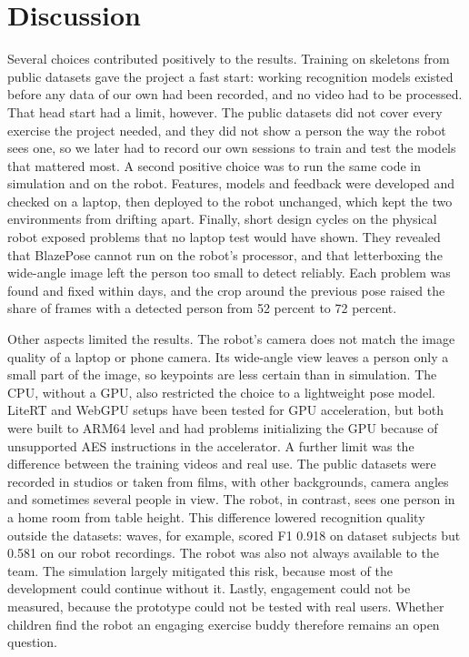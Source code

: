 \section{Discussion}

Several choices contributed positively to the results. Training on skeletons from public datasets gave the project a fast start: working recognition models existed before any data of our own had been recorded, and no video had to be processed. That head start had a limit, however. The public datasets did not cover every exercise the project needed, and they did not show a person the way the robot sees one, so we later had to record our own sessions to train and test the models that mattered most. A second positive choice was to run the same code in simulation and on the robot. Features, models and feedback were developed and checked on a laptop, then deployed to the robot unchanged, which kept the two environments from drifting apart. Finally, short design cycles on the physical robot exposed problems that no laptop test would have shown. They revealed that BlazePose cannot run on the robot's processor, and that letterboxing the wide-angle image left the person too small to detect reliably. Each problem was found and fixed within days, and the crop around the previous pose raised the share of frames with a detected person from 52 percent to 72 percent. \newline

Other aspects limited the results. The robot's camera does not match the image quality of a laptop or phone camera. Its wide-angle view leaves a person only a small part of the image, so keypoints are less certain than in simulation. The CPU, without a GPU, also restricted the choice to a lightweight pose model. LiteRT and WebGPU setups have been tested for GPU acceleration, but both were built to ARM64 level and had problems initializing the GPU because of unsupported AES instructions in the accelerator. A further limit was the difference between the training videos and real use. The public datasets were recorded in studios or taken from films, with other backgrounds, camera angles and sometimes several people in view. The robot, in contrast, sees one person in a home room from table height. This difference lowered recognition quality outside the datasets: waves, for example, scored F1 0.918 on dataset subjects but 0.581 on our robot recordings. The robot was also not always available to the team. The simulation largely mitigated this risk, because most of the development could continue without it. Lastly, engagement could not be measured, because the prototype could not be tested with real users. Whether children find the robot an engaging exercise buddy therefore remains an open question.

